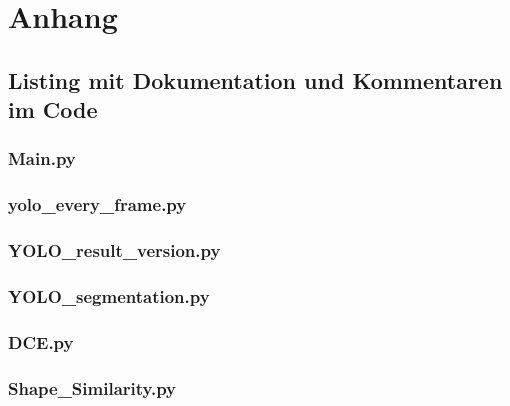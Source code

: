 \chapter{Anhang}

\section{Listing mit Dokumentation und Kommentaren im Code}{\label{cd:gesamt_listing}}



\subsection{Main.py}{
    }

\subsection{yolo\_every\_frame.py}{
    }

\subsection{YOLO\_result\_version.py}{
    }

\subsection{YOLO\_segmentation.py}{
    }

\subsection{DCE.py}{
    }

\subsection{Shape\_Similarity.py}{
    
}

